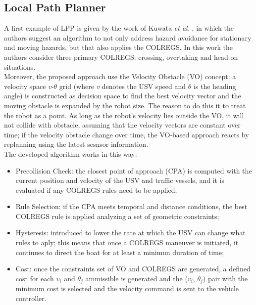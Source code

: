 \documentclass[journal]{IEEEtran}
\begin{document}
  \subsection{Local Path Planner} \label{lpp}
  A first example of LPP is given by the work of Kuwata \textit{et al.} \cite{Kuwata2014}, in which the authors suggest an algorithm to not only address hazard avoidance for stationary and moving hazards, but that also applies the COLREGS. In this work the authors consider three primary COLREGS: crossing, overtaking and head-on situations.\\
  Moreover, the proposed approach use the Velocity Obstacle (VO) concept: a velocity space \textit{v-$\theta$} grid (where \textit{v} denotes the USV speed and \textit{$\theta$} is the heading angle) is constructed as decision space to find the best velocity vector and the moving obstacle is expanded by the robot size. The reason to do this it to treat the robot as a point. As long as the robot's velocity lies outside the VO, it will not collide with obstacle, assuming that the velocity vectors are constant over time; if the velocity obstacle change over time, the VO-based approach reacts by replanning using the latest sesnsor information.\\
  The developed algorithm works in this way:
  \begin{itemize}
  \item Precollision Check: the closest point of approach (CPA) is computed with the current position and velocity of the USV and traffic vessels, and it is evaluated if any COLREGS rules need to be applied;
  \item Rule Selection: if the CPA meets temporal and distance conditions, the best COLREGS rule is applied analyzing a set of geometric constraints;
  \item Hysteresis: introduced to lower the rate at which the USV can change what rules to aply; this means that once a COLREGS maneuver is initiated, it continues to direct the boat for at least a minimun duration of time;
  \item Cost: once the constraints set of VO and COLREGS are generated, a defined cost for each \textit{$v_i$} and \textit{$\theta_j$} ammissible is generated and the (\textit{$v_i$}, \textit{$\theta_j$}) pair with the minimum cost is selected and the velocity command is sent to the vehicle controller.
  \end{itemize}
\end{document}
